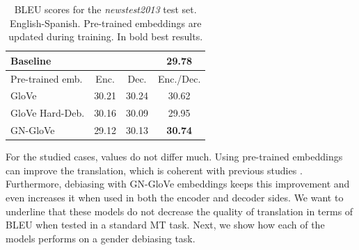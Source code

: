 \documentclass[11pt,a4paper]{article}
\begin{document}






\begin{table}[h!]
\centering
\begin{tabular}{lccc}
    \toprule
    Baseline & & & 29.78 \\
    \midrule
    Pre-trained emb. & Enc. & Dec. & Enc./Dec. \\
    \midrule
    GloVe & 30.21 & 30.24 & 30.62 \\
    GloVe Hard-Deb. & 30.16 & 30.09 & 29.95 \\
    GN-GloVe & 29.12 & 30.13 & \textbf{30.74} \\
    \bottomrule
\end{tabular}
\caption{BLEU scores for the \textit{newstest2013} test set. English-Spanish. Pre-trained embeddings are updated during training. In bold best results.}
\label{tab:bleu-newstest2013}
\end{table}

For the studied cases, values do not differ much.
Using pre-trained embeddings can improve the translation, which is coherent with previous studies \cite{qi-EtAl:2018:N18-2}. Furthermore, debiasing with GN-GloVe embeddings keeps this improvement and even increases it when used in both the encoder and  decoder sides. 
We want to underline that these models do not decrease the quality of translation in terms of BLEU when tested in a standard MT task.
Next, we show how each of the models performs on a gender debiasing task. 


\end{document}
